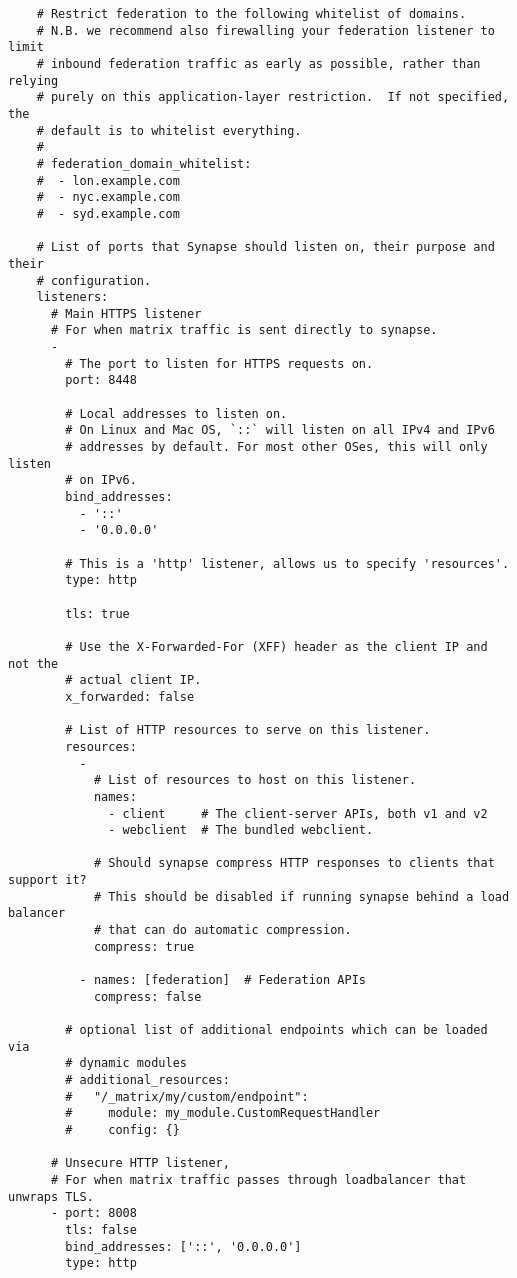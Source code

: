 \begin{lstlisting}
    # Restrict federation to the following whitelist of domains.
    # N.B. we recommend also firewalling your federation listener to limit
    # inbound federation traffic as early as possible, rather than relying
    # purely on this application-layer restriction.  If not specified, the
    # default is to whitelist everything.
    #
    # federation_domain_whitelist:
    #  - lon.example.com
    #  - nyc.example.com
    #  - syd.example.com
    
    # List of ports that Synapse should listen on, their purpose and their
    # configuration.
    listeners:
      # Main HTTPS listener
      # For when matrix traffic is sent directly to synapse.
      -
        # The port to listen for HTTPS requests on.
        port: 8448
    
        # Local addresses to listen on.
        # On Linux and Mac OS, `::` will listen on all IPv4 and IPv6
        # addresses by default. For most other OSes, this will only listen
        # on IPv6.
        bind_addresses:
          - '::'
          - '0.0.0.0'
    
        # This is a 'http' listener, allows us to specify 'resources'.
        type: http
    
        tls: true
    
        # Use the X-Forwarded-For (XFF) header as the client IP and not the
        # actual client IP.
        x_forwarded: false
    
        # List of HTTP resources to serve on this listener.
        resources:
          -
            # List of resources to host on this listener.
            names:
              - client     # The client-server APIs, both v1 and v2
              - webclient  # The bundled webclient.
    
            # Should synapse compress HTTP responses to clients that support it?
            # This should be disabled if running synapse behind a load balancer
            # that can do automatic compression.
            compress: true
    
          - names: [federation]  # Federation APIs
            compress: false
    
        # optional list of additional endpoints which can be loaded via
        # dynamic modules
        # additional_resources:
        #   "/_matrix/my/custom/endpoint":
        #     module: my_module.CustomRequestHandler
        #     config: {}
    
      # Unsecure HTTP listener,
      # For when matrix traffic passes through loadbalancer that unwraps TLS.
      - port: 8008
        tls: false
        bind_addresses: ['::', '0.0.0.0']
        type: http
    

\end{lstlisting}

